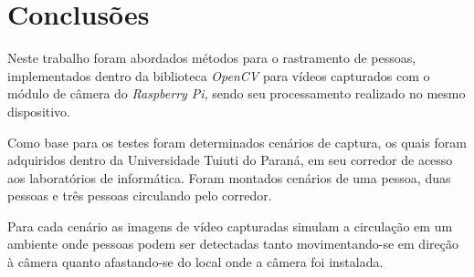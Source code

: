 \documentclass[12pt,oneside,a4paper,chapter=TITLE,section=TITLE,sumario=tradicional]{abntex2}
\begin{document}
\begin{figure}[htb]
    \hfil
    \hfil

    \hfil
    \hfil
    
    \fonteautor
\end{figure}

\begin{figure}[htb]
    \hfil
    
    \hfil
    
    \fonteautor
\end{figure}




\chapter{Conclusões}
\label{cap:conclusao}

Neste trabalho foram abordados métodos para o rastramento de pessoas, implementados dentro da biblioteca \textit{OpenCV} para vídeos capturados com o módulo de câmera do \textit{Raspberry Pi}, sendo seu processamento realizado no mesmo dispositivo.

Como base para os testes foram determinados cenários de captura, os quais foram adquiridos dentro da Universidade Tuiuti do Paraná, em seu corredor de acesso aos laboratórios de informática.
Foram montados cenários de uma pessoa, duas pessoas e três pessoas circulando pelo corredor.

Para cada cenário as imagens de vídeo capturadas simulam a circulação em um ambiente onde pessoas podem ser detectadas tanto movimentando-se em direção à câmera quanto afastando-se do local onde a câmera foi instalada.
\end{document}

